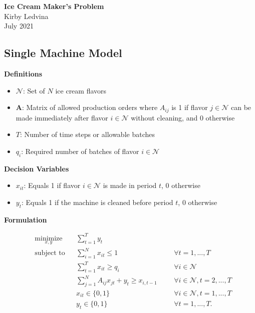 \documentclass{article}
\begin{document}
\begingroup  
  \centering
  \large \textbf{Ice Cream Maker's Problem} \\[0.5em]
  \normalsize Kirby Ledvina \\
  \normalsize July 2021 \par
\endgroup

\subsection*{Single Machine Model}

\noindent\textbf{Definitions}
\begin{itemize}
    \item $\mathcal{N}$: Set of $N$ ice cream flavors
    \item $\mathbf{A}$: Matrix of allowed production orders where $A_{ij}$ is 1 if flavor $j \in \mathcal{N}$ can be made immediately after flavor $i \in \mathcal{N}$ without cleaning, and 0 otherwise
    \item $T$: Number of time steps or allowable batches
    \item $q_i$: Required number of batches of flavor $i \in \mathcal{N}$
 

\end{itemize} 

\noindent\textbf{Decision Variables}
\begin{itemize}
    \item $x_{it}$: Equals 1 if flavor $i \in \mathcal{N}$ is made in period $t$, 0 otherwise
    \item $y_{t}$: Equals 1 if the machine is cleaned before period $t$, 0 otherwise
\end{itemize}

\noindent\textbf{Formulation}

\begin{equation*}
\begin{aligned}
& \underset{x,y}{\text{minimize}}
    &&  \sum_{t=1}^T y_t \\
& \text{subject to}
    && \sum_{i=1}^N x_{it} \leq 1
        &&&\forall t=1,...,T \\
&
    & & \sum_{t=1}^{T}{x_{it}} \geq q_i
        &&&\forall i \in \mathcal{N} \\
&
     && \sum_{j=1}^N A_{ij}x_{jt} + y_t \geq x_{i,t-1}
            &&&\forall i \in \mathcal{N}, t=2,...,T \\
&
    & & x_{it} \in \{0,1\}
        &&&\forall i \in \mathcal{N}, t=1,...,T  \\
&
    & & y_{t} \in \{0,1\}
        &&&\forall t = 1,...,T.
\end{aligned}
\end{equation*}
\end{document}
